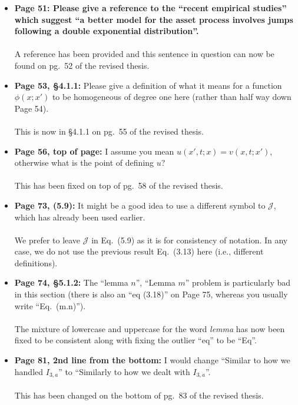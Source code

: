 \documentclass{article}
\begin{document}
\begin{enumerate}
\begin{itemize}
			\item{\textbf{Page 51:  Please give a reference to the ``recent empirical studies'' which suggest ``a better model for the asset process involves jumps following a double exponential distribution''.}
			\\\\}
			A reference has been provided and this sentence in question can now be found on pg.~52 of the revised thesis.
			
			\item{\textbf{Page 53, \S4.1.1: } Please give a definition of what it means for a function $\phi(x;x')$ to be homogeneous of degree one here (rather than half way down Page 54).
			\\\\}
			This is now in \S4.1.1 on pg.~55 of the revised thesis.
			
			\item{\textbf{Page 56, top of page: } I assume you mean $u(x',t;x) = v(x,t;x')$, otherwise what is the point of defining $u$?
			\\\\}
			This has been fixed on top of pg.~58 of the revised thesis.
			
			\item{\textbf{Page 73, (5.9): } It might be a good idea to use a different symbol to $\mathscr{J}$, which has already been used earlier.
			\\\\}
			We prefer to leave $\mathscr{J}$ in Eq.~(5.9) as it is for consistency of notation. In any case, we do not use the previous result Eq.~(3.13) here (i.e., different definitions).
			
			\item{\textbf{Page 74, \S5.1.2: } The ``lemma $n$'', ``Lemma $m$'' problem is particularly bad in this section (there is also an ``eq (3.18)'' on Page 75, whereas you usually write ``Eq.~(m.n)'').
			\\\\}
			The mixture of lowercase and uppercase for the word \emph{lemma} has now been fixed to be consistent along with fixing the outlier ``eq'' to be ``Eq''.
			
			\item{\textbf{Page 81, 2nd line from the bottom: } I would change ``Similar to how we handled $I_{3,a}$'' to ``Similarly to how we dealt with $I_{3,a}$''.
			\\\\}
			This has been changed on the bottom of pg.~83 of the revised thesis.
			

\end{itemize}
\end{enumerate}
\end{document}

